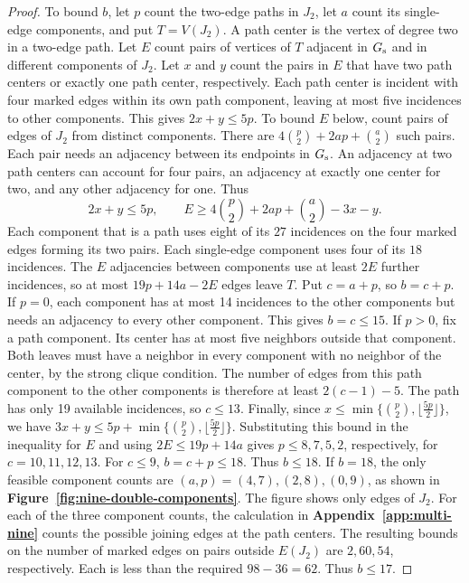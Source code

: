 \documentclass[preprint,11pt,numbers]{elsarticle-arxiv}
\numberwithin{equation}{section}
\theoremstyle{definition}
\begin{document}
\begin{proof}
To bound $b$, let $p$ count the two-edge paths in $J_2$, let
$a$ count its single-edge components, and put $T=V(J_2)$.
A path center is the vertex of degree two in a two-edge path.
Let $E$ count pairs of vertices of $T$ adjacent in $G_{\rm s}$
and in different components of $J_2$. Let $x$ and $y$ count
the pairs in $E$ that have two path centers or exactly one path
center, respectively. Each path center is incident with four
marked edges within its own path component, leaving at most
five incidences to other components. This gives $2x+y\le5p$.
To bound $E$ below, count pairs of edges of $J_2$ from distinct
components. There are $4\binom{p}{2}+2ap+\binom{a}{2}$ such
pairs. Each pair needs an adjacency between its endpoints in
$G_{\rm s}$. An adjacency at two path centers can account for
four pairs, an adjacency at exactly one center for two, and any
other adjacency for one. Thus
\[
 2x+y\le5p,\qquad
 E\ge4\binom{p}{2}+2ap+\binom{a}{2}-3x-y.
\]
Each component that is a path uses eight of its $27$ incidences
on the four marked edges forming its two pairs. Each single-edge
component uses four of its $18$ incidences. The $E$ adjacencies
between components use at least $2E$ further incidences, so
at most $19p+14a-2E$ edges leave $T$. Put $c=a+p$, so $b=c+p$.
If $p=0$, each component has at most 14 incidences to the other
components but needs an adjacency to every other component.
This gives $b=c\le15$. If $p>0$, fix a path component. Its
center has at most five neighbors outside that component. Both
leaves must have a neighbor in every component with no neighbor
of the center, by the strong clique condition. The number of
edges from this path component to the other components is
therefore at least $2(c-1)-5$. The path has only 19 available
incidences, so $c\le13$. Finally, since
$x\le\min\{\binom{p}{2},\lfloor\frac{5p}{2}\rfloor\}$, we have
$3x+y\leq5p+\min\{\binom{p}{2},\lfloor\frac{5p}{2}\rfloor\}$.
Substituting this bound in the inequality for $E$ and using
$2E\leq19p+14a$ gives $p\leq8,7,5,2$, respectively, for
$c=10,11,12,13$. For $c\leq9$, $b=c+p\leq18$. Thus $b\leq18$.
If $b=18$, the only feasible component counts are
$(a,p)=(4,7),(2,8),(0,9)$, as shown in
\textbf{Figure~\ref{fig:nine-double-components}}. The figure shows
only edges of $J_2$. For each of the three component counts,
the calculation in \textbf{Appendix~\ref{app:multi-nine}}
counts the possible joining edges at the path centers. The
resulting bounds on the number of marked edges on pairs outside
$E(J_2)$ are $2,60,54$, respectively. Each is less than the
required $98-36=62$. Thus $b\le17$.

\end{proof}
\end{document}
